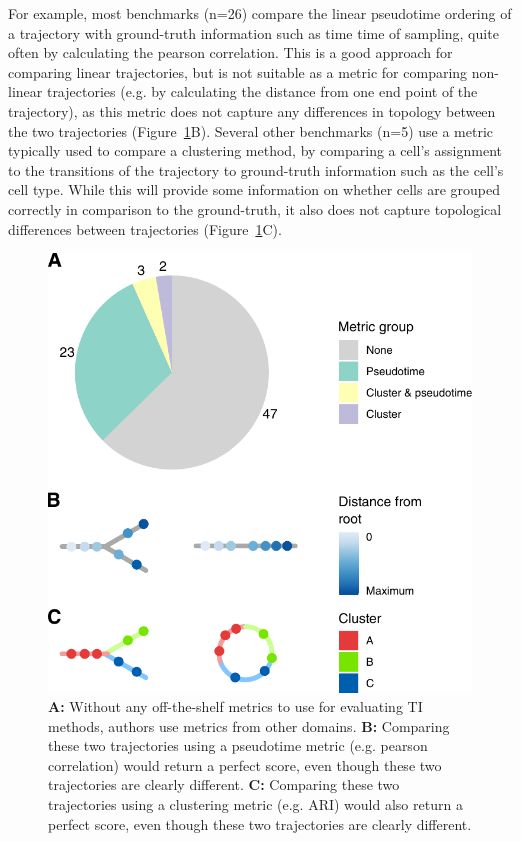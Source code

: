 For example, most benchmarks (n=26) compare the linear pseudotime ordering of a trajectory with ground-truth information such as time time of sampling, quite often by calculating the pearson correlation. This is a good approach for comparing linear trajectories, but is not suitable as a metric for comparing non-linear trajectories (e.g. by calculating the distance from one end point of the trajectory), as this metric does not capture any differences in topology between the two trajectories (Figure~\ref{fig:metrics}B).
Several other benchmarks (n=5) use a metric typically used to compare a clustering method, by comparing a cell's assignment to the transitions of the trajectory to ground-truth information such as the cell's cell type. While this will provide some information on whether cells are grouped correctly in comparison to the ground-truth, it also does not capture topological differences between trajectories (Figure~\ref{fig:metrics}C). 

\begin{figure}[htb!]
	\centering
	\includegraphics[width=.6\linewidth]{fig/perturbations.pdf} 
	\caption{
		\textbf{A:} Without any off-the-shelf metrics to use for evaluating TI methods, authors use metrics from other domains.
		\textbf{B:} Comparing these two trajectories using a pseudotime metric (e.g. pearson correlation) would return a perfect score, even though these two trajectories are clearly different.
		\textbf{C:} Comparing these two trajectories using a clustering metric (e.g. ARI) would also return a perfect score, even though these two trajectories are clearly different.
	}
	\label{fig:metrics}
\end{figure}


